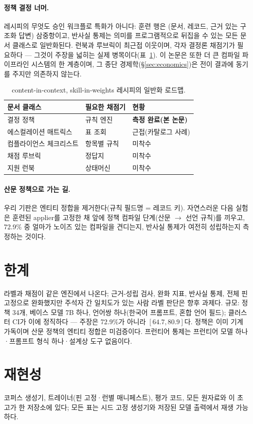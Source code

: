 \documentclass[11pt]{article}
\begin{document}
\paragraph{정책 결정 너머.} 레시피의 무엇도 승인 워크플로 특화가 아니다: 훈련 행은 (문서, 레코드, 근거 있는 구조화 답변) 삼중항이고, 반사실 통제는 의미를 프로그램적으로 뒤집을 수 있는 모든 문서 클래스로 일반화된다. 런북과 루브릭이 최근접 이웃이며, 각자 결정론 채점기가 필요하다 --- 그것이 주장을 넓히는 실제 병목이다(표~\ref{tab:roadmap}). 이 논문은 또한 더 큰 컴파일 파이프라인 시스템의 한 계층이며, 그 종단 경제학(\S\ref{sec:economics})은 전이 결과에 동기를 주지만 의존하지 않는다.

\begin{table}[t]\footnotesize
  \centering
  \begin{tabular}{@{}p{2.3cm}p{2.2cm}p{2.2cm}@{}}
    \toprule
    문서 클래스 & 필요한 채점기 & 현황 \\
    \midrule
    결정 정책 & 규칙 엔진 & \textbf{측정 완료(본 논문)} \\
    에스컬레이션 매트릭스 & 표 조회 & 근접(카탈로그 사례) \\
    컴플라이언스 체크리스트 & 항목별 규칙 & 미착수 \\
    채점 루브릭 & 정답지 & 미착수 \\
    지원 런북 & 상태머신 & 미착수 \\
    \bottomrule
  \end{tabular}
  \caption{content-in-context, skill-in-weights 레시피의 일반화 로드맵.}
  \label{tab:roadmap}
\end{table}

\paragraph{산문 정책으로 가는 길.} 우리 기판은 엔티티 정합을 제거한다(규칙 필드명 = 레코드 키). 자연스러운 다음 실험은 훈련된 applier를 고정한 채 앞에 정책 컴파일 단계(산문 $\rightarrow$ 선언 규칙)를 끼우고, 72.9\% 중 얼마가 노이즈 있는 컴파일을 견디는지, 반사실 통제가 여전히 성립하는지 측정하는 것이다.

\section*{한계}
라벨과 채점이 같은 엔진에서 나온다; 근거-성립 검사, 완화 지표, 반사실 통제, 전체 핀 고정으로 완화했지만 주석자 간 일치도가 있는 사람 라벨 판단은 향후 과제다. 규모: 정책 34개, 베이스 모델 7B 하나, 언어쌍 하나(한국어 프롬프트, 혼합 언어 필드); 클러스터 CI가 이에 정직하다 --- 주장은 72.9\%가 아니라 $[64.7, 80.9]$다. 정책은 이미 기계가독이며 산문 정책의 엔티티 정합은 미검증이다. 프런티어 통제는 프런티어 모델 하나·프롬프트 형식 하나·설계상 도구 없음이다.

\section*{재현성}
코퍼스 생성기, 트레이너(핀 고정·런별 매니페스트), 평가 코드, 모든 원자료와 이 초고가 한 저장소에 있다; 모든 표는 시드 고정 생성기와 저장된 모델 출력에서 재생 가능하다.


\end{document}
